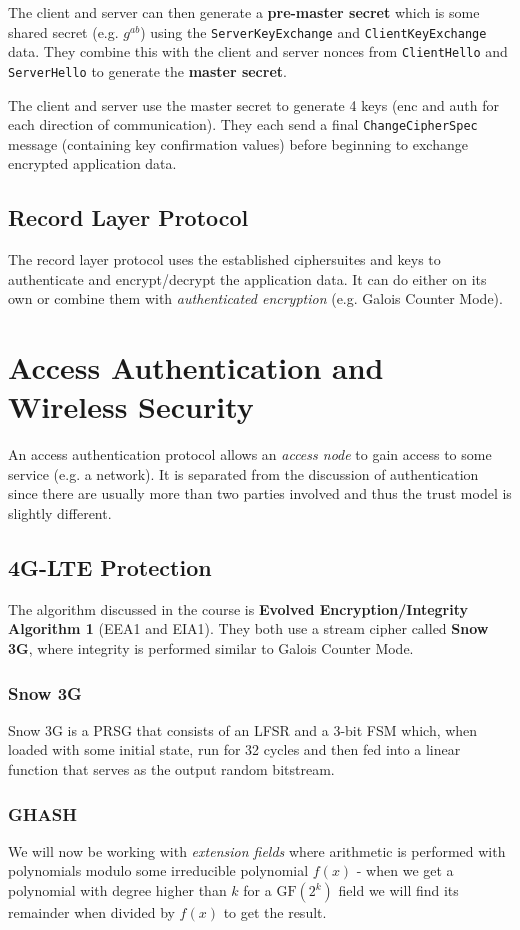 \documentclass[11pt]{report}
\begin{document}
The client and server can then generate a \textbf{pre-master secret} which is some shared secret (e.g. $g^{ab}$) using the \texttt{ServerKeyExchange} and \texttt{ClientKeyExchange} data. They combine this with the client and server nonces from \texttt{ClientHello} and \texttt{ServerHello} to generate the \textbf{master secret}.

The client and server use the master secret to generate 4 keys (enc and auth for each direction of communication). They each send a final \texttt{ChangeCipherSpec} message (containing key confirmation values) before beginning to exchange encrypted application data.

\subsection{Record Layer Protocol}
The record layer protocol uses the established ciphersuites and keys to authenticate and encrypt/decrypt the application data. It can do either on its own or combine them with \textit{authenticated encryption} (e.g. Galois Counter Mode).

\section{Access Authentication and Wireless Security}
An access authentication protocol allows an \textit{access node} to gain access to some service (e.g. a network). It is separated from the discussion of authentication since there are usually more than two parties involved and thus the trust model is slightly different.

\subsection{4G-LTE Protection}
The algorithm discussed in the course is \textbf{Evolved Encryption/Integrity Algorithm 1} (EEA1 and EIA1). They both use a stream cipher called \textbf{Snow 3G}, where integrity is performed similar to Galois Counter Mode.

\subsubsection{Snow 3G}
Snow 3G is a PRSG that consists of an LFSR and a 3-bit FSM which, when loaded with some initial state, run for 32 cycles and then fed into a linear function that serves as the output random bitstream.

\subsubsection{GHASH}
We will now be working with \textit{extension fields} where arithmetic is performed with polynomials modulo some irreducible polynomial $f(x)$ - when we get a polynomial with degree higher than $k$ for a $\text{GF}(2^k)$ field we will find its remainder when divided by $f(x)$ to get the result.
\end{document}
